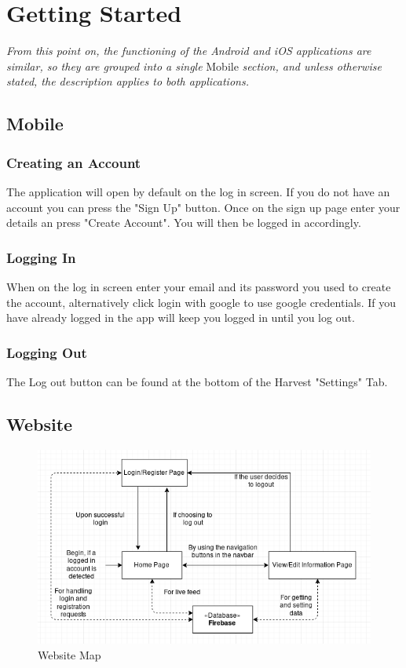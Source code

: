 \documentclass[11pt]{article}
\begin{document}
\newpage
\section{Getting Started}
\textit{From this point on, the functioning of the Android and iOS applications are similar, so they are grouped into a single} Mobile \textit{section, and unless otherwise stated, the description applies to both applications.}

\subsection{Mobile}

\subsubsection{Creating an Account}
The application will open by default on the log in screen. If you do not have an account you can press the "Sign Up" button. Once on the sign up page enter your details an press "Create Account". You will then be logged in accordingly.

\subsubsection{Logging In}
When on the log in screen enter your email and its password you used to create the account, alternatively click login with google to use google credentials. If you have already logged in the app will keep you logged in until you log out.

\subsubsection{Logging Out}
The Log out button can be found at the bottom of the Harvest "Settings" Tab.

\subsection{Website}

\begin{figure}
 \centering
 \includegraphics[width=12cm, keepaspectratio]{Images/Map.png}
 \caption{Website Map}
 \label{WebsiteMap}
\end{figure}
\end{document}
